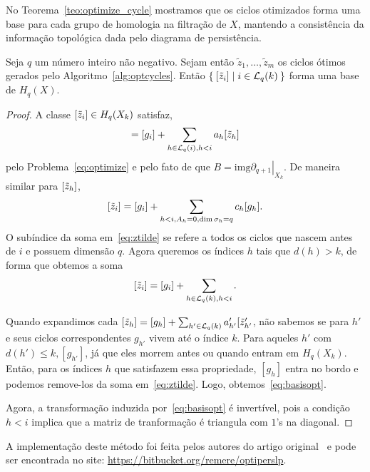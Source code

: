 No Teorema~\ref{teo:optimize_cycle} mostramos que os ciclos otimizados forma uma base para cada 
grupo de homologia na filtração de $X$, mantendo a consistência da informação topológica dada
pelo diagrama de persistência. 
\begin{teo}\label{teo:optimize_cycle}
    Seja $q$ um número inteiro não negativo. Sejam então $\tilde{z}_1, \dots, \tilde{z}_m$ os 
    ciclos ótimos gerados pelo Algoritmo~\ref{alg:optcycles}. Então 
    $\Set{[\tilde{z}_i] | i \in \mathcal{L}_q(k)}$ forma uma base de $H_q(X)$.
\end{teo}
\begin{proof}
    A classe $[\tilde{z}_i] \in H_q(X_k)$ satisfaz, 
    \begin{equation*}
        [\ztilde_i] = [g_i] + \sum_{h\in \mathcal{L}_q(i), h<i} a_h[\ztilde_h]
    \end{equation*}
    pelo Problema~\ref{eq:optimize} e pelo fato de que $B = \text{img}\left.
    \partial_{q+1}\right|_{X_k}$. De maneira similar para $[\tilde{z}_h]$, 
    \begin{equation}\label{eq:ztilde}
        [\tilde{z}_i] = [g_i] + \sum_{h<i, A_h = 0, \dim\sigma_h = q} c_h [g_h]. 
    \end{equation}
    O subíndice da soma em~\eqref{eq:ztilde} se refere a todos os ciclos que nascem antes
    de $i$ e possuem dimensão $q$. Agora queremos os índices $h$ tais que $d(h) > k$, de 
    forma que obtemos a soma
    \begin{equation}\label{eq:basisopt}
        [\tilde{z}_i] = [g_i] + \sum_{h \in \mathcal{L}_q(k), h<i}.
    \end{equation}  
    
    Quando expandimos cada $[\tilde{z}_h] = [g_h] + \sum_{h' \in \mathcal{L}_q(k)} 
    a'_{h'}[\tilde{z}'_{h'}$, não sabemos se para $h'$ e seus ciclos correspondentes
    $g_{h'}$ vivem até o índice $k$. Para aqueles $h'$ com $d(h') \leq k, [g_{h'}]$,
    já que eles morrem antes ou quando entram em $H_q(X_k)$. Então, para os índices $h$
    que satisfazem essa propriedade, $[g_h]$ entra no bordo e podemos remove-los da soma
    em~\eqref{eq:ztilde}. Logo, obtemos~\eqref{eq:basisopt}. 

    Agora, a transformação induzida por~\eqref{eq:basisopt} é invertível, pois a condição
    $h < i$ implica que a matriz de tranformação é triangula com $1$'s na diagonal. 
\end{proof} 

A implementação deste método foi feita pelos autores do artigo original~\cite{Escolar2015} e
pode ser encontrada no site: \url{https://bitbucket.org/remere/optiperslp}.

